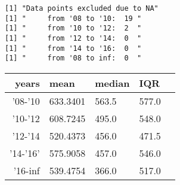 \documentclass[11pt]{article}
\begin{document}
    \begin{Verbatim}[commandchars=\\\{\}]
[1] "Data points excluded due to NA"
[1] "     from '08 to '10:  19 "
[1] "     from '10 to '12:  2  "
[1] "     from '12 to '14:  0  "
[1] "     from '14 to '16:  0  "
[1] "     from '08 to inf:  0  "

    \end{Verbatim}

    \begin{tabular}{r|llll}
 years & mean & median & IQR\\
\hline
	 '08-'10  & 633.3401 & 563.5    & 577.0   \\
	 '10-'12  & 608.7245 & 495.0    & 548.0   \\
	 '12-'14  & 520.4373 & 456.0    & 471.5   \\
	 '14-'16' & 575.9058 & 457.0    & 546.0   \\
	 '16-inf  & 539.4754 & 366.0    & 517.0   \\
\end{tabular}
\end{document}
